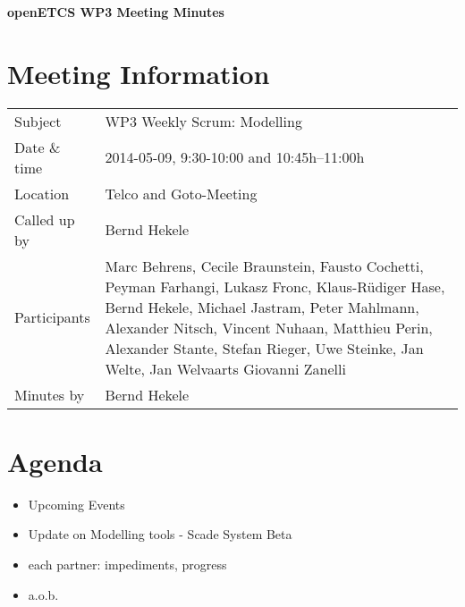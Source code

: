 \documentclass[a4paper, 11pt]{article}
\begin{document}
{\begin{center}\huge\bf openETCS WP3 Meeting Minutes\end{center}}
\section{Meeting Information}

\renewcommand{\arraystretch}{1.5}
\begin{supertabular}{m{.2\textwidth}m{.8\textwidth}}
Subject & WP3 Weekly Scrum: Modelling\\
Date \& time & 2014-05-09, 9:30-10:00 and 10:45h--11:00h\\
Location & Telco and Goto-Meeting\\
Called up by & Bernd Hekele\\
Participants &
Marc Behrens,
Cecile Braunstein,
Fausto Cochetti,
Peyman Farhangi,
Lukasz Fronc,
Klaus-R\"udiger Hase,
Bernd Hekele,
Michael Jastram,
Peter Mahlmann,
Alexander Nitsch,
Vincent Nuhaan,
Matthieu Perin,
Alexander Stante,
Stefan Rieger,
Uwe Steinke,
Jan Welte,
Jan Welvaarts
Giovanni Zanelli
\\

Minutes by & Bernd Hekele\\
\end{supertabular}
\renewcommand{\arraystretch}{1.0}


\section{{Agenda}}
\begin{itemize}
\item Upcoming Events
\item Update on Modelling tools - Scade System Beta
\item each partner: impediments, progress
\item a.o.b.
\end{itemize}
\end{document}
